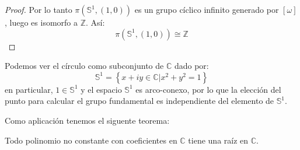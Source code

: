 \documentclass[12pt]{report}
\theoremstyle{largebreak}
\begin{document}
\begin{proof}
        Por lo tanto $\pi(\mathbb{S}^1,(1,0))$ es un grupo cíclico infinito generado por $[\omega]$, luego es isomorfo a $\mathbb{Z}$. Así:
        \begin{equation*}
            \pi(\mathbb{S}^1,(1,0))\cong\mathbb{Z}
        \end{equation*}
    \end{proof}

    \begin{obs}
        Podemos ver el círculo como subconjunto de $\mathbb{C}$ dado por:
        \begin{equation*}
            \mathbb{S}^1=\left\{x+iy\in\mathbb{C}\Big|x^2+y^2=1 \right\}
        \end{equation*}
        en particular, $1\in\mathbb{S}^1$ y el espacio $\mathbb{S}^1$ es arco-conexo, por lo que la elección del punto para calcular el grupo fundamental es independiente del elemento de $\mathbb{S}^1$.
    \end{obs}

    Como aplicación tenemos el siguente teorema:

    \begin{theor}
        Todo polinomio no constante con coeficientes en $\mathbb{C}$ tiene una raíz en $\mathbb{C}$.
    \end{theor}
\end{document}
